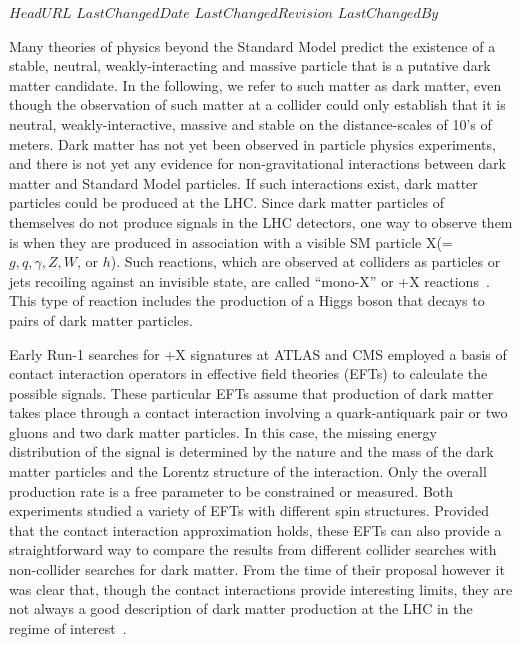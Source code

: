 \svnidlong
{$HeadURL$}
{$LastChangedDate$}
{$LastChangedRevision$}
{$LastChangedBy$}

Many theories of physics beyond the Standard Model predict the existence
of a stable, neutral, weakly-interacting and massive particle that is
a putative dark matter candidate.   In the following, we refer to such
matter as dark matter, even though the observation of such matter at a collider
could only establish that it is neutral, weakly-interactive, massive and stable
on the distance-scales of 10's of meters.
Dark matter has not yet been observed in particle physics experiments, and
there is not yet any evidence for non-gravitational interactions
between dark matter and Standard Model particles.  If such
interactions exist, dark matter particles could be produced
at the LHC. Since dark matter particles of themselves do not produce signals
in the LHC detectors, one way to observe them is when they are produced in association
with a visible SM particle X(=$g, q, \gamma, Z, W$, or $h$).
Such reactions, which are
observed at colliders as particles or jets recoiling against an invisible state, are
called ``mono-X'' or \MET{}+X reactions~\cite{Feng:2005gj,Beltran:2010ww,Bai:2010hh}.
This type of reaction includes the production of a Higgs boson that
decays to pairs of dark matter particles.

Early Run-1 searches for \MET{}+X signatures at ATLAS and CMS employed
a basis of contact interaction operators in 
effective field theories (EFTs) \cite{Goodman:2010yf,Goodman:2010ku} to
calculate the possible signals.
These particular EFTs assume that production of dark matter takes place through
a contact interaction involving a quark-antiquark pair or two gluons and
two dark matter particles.  In this case,
the missing
energy distribution of the signal is determined
by the nature and the mass of the dark
matter particles and the Lorentz structure of the interaction. Only the
overall production rate is a free parameter to be constrained or measured.
Both experiments studied a variety
of EFTs with different spin structures. Provided that the contact
interaction approximation holds, these EFTs can also provide a
straightforward way to compare the results from different collider
searches with non-collider searches for dark matter.  
From the time of their proposal however it was clear that,
 though the contact interactions provide interesting limits, 
 they are not always a good description of dark matter production 
 at the LHC in the regime of interest~\cite{Goodman:2010yf,Shoemaker:2011vi}. 

